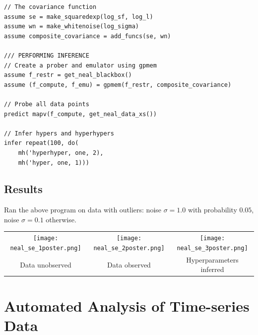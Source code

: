 \documentclass[a0,portrait]{a0poster}
\begin{document}
\begin{multicols}{3}
\begin{minipage}{\linewidth}
\begin{lstlisting}[frame=single,mathescape,label=alg:gphierarch,basicstyle=\fontsize{20}{22}\selectfont\ttfamily]
// The covariance function
assume se = make_squaredexp(log_sf, log_l)
assume wn = make_whitenoise(log_sigma)
assume composite_covariance = add_funcs(se, wn)

/// PERFORMING INFERENCE
// Create a prober and emulator using gpmem
assume f_restr = get_neal_blackbox()
assume (f_compute, f_emu) = gpmem(f_restr, composite_covariance)

// Probe all data points
predict mapv(f_compute, get_neal_data_xs())

// Infer hypers and hyperhypers
infer repeat(100, do(
    mh('hyperhyper, one, 2),
    mh('hyper, one, 1)))

\end{lstlisting}
\end{minipage}
\subsection*{Results}
Ran the above program on data with outliers: noise $\sigma = 1.0$ with probability $0.05$, noise $\sigma = 0.1$ otherwise.
\begin{center}
\begin{tabular}{ccc}
  \texttt{[image: neal\_se\_1poster.png]}&
  \texttt{[image: neal\_se\_2poster.png]}&
  \texttt{[image: neal\_se\_3poster.png]}\\
  Data unobserved &
  Data observed &
  Hyperparameters inferred
\end{tabular}
\end{center}



%


\section*{Automated Analysis of Time-series Data}

\end{multicols}
\end{document}
